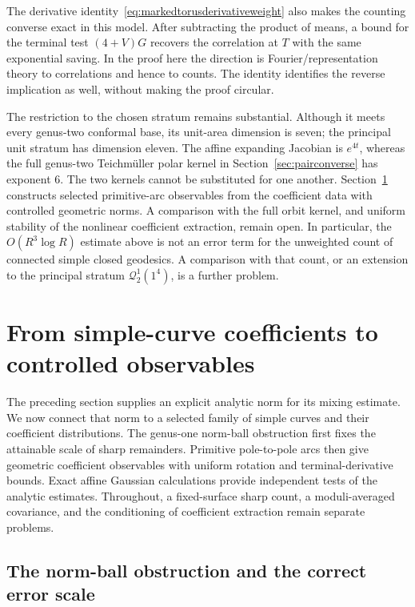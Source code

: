 \documentclass[11pt,a4paper]{article}
\numberwithin{equation}{section}
\theoremstyle{definition}
\theoremstyle{remark}
\begin{document}
The derivative identity~\eqref{eq:markedtorusderivativeweight} also makes
the counting converse exact in this model. After subtracting the product
of means, a bound for the terminal test $(4+V)G$ recovers the correlation
at $T$ with the same exponential saving. In the proof here the direction
is Fourier/representation theory to correlations and hence to counts.
The identity identifies the reverse implication as well, without making
the proof circular.

The restriction to the chosen stratum remains substantial. Although it
meets every genus-two conformal base, its unit-area dimension is seven;
the principal unit stratum has dimension eleven. The affine expanding
Jacobian is $e^{4t}$, whereas the full genus-two Teichm\"uller polar kernel
in Section~\ref{sec:pairconverse} has exponent $6$. The two kernels cannot
be substituted for one another. Section~\ref{sec:coefficientobservables}
constructs selected primitive-arc observables from the coefficient data
with controlled geometric norms. A comparison with the full orbit kernel,
and uniform stability of the nonlinear coefficient extraction, remain
open. In particular, the $O(R^3\log R)$ estimate above is not an error
term for the unweighted count of connected simple closed geodesics.
A comparison with that count, or an extension to the principal stratum
$\mathcal Q^1_2(1^4)$, is a further problem.



\section{From simple-curve coefficients to controlled observables}
\label{sec:coefficientobservables}

The preceding section supplies an explicit analytic norm for its mixing
estimate. We now connect that norm to a selected family of simple curves
and their coefficient distributions. The genus-one norm-ball obstruction
first fixes the attainable scale of sharp remainders. Primitive
pole-to-pole arcs then give geometric coefficient observables with
uniform rotation and terminal-derivative bounds. Exact affine Gaussian
calculations provide independent tests of the analytic estimates.
Throughout, a fixed-surface sharp count, a moduli-averaged covariance,
and the conditioning of coefficient extraction remain separate problems.

\subsection{The norm-ball obstruction and the correct error scale}
\label{subsec:normballbarrier}
\end{document}
